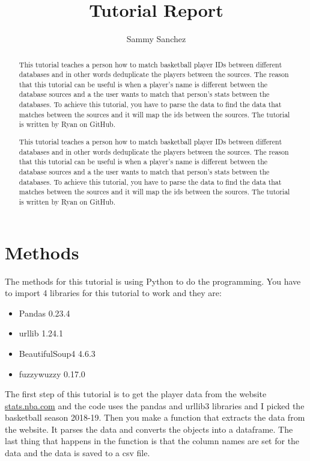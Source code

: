 \documentclass[10pt,twocolumn]{article}
\title{Tutorial Report}
\author{Sammy Sanchez}
\affiliation{Occidental College}
\begin{document}
\maketitle

\begin{abstract}

This tutorial teaches a person how to match basketball player IDs between different databases and in other words deduplicate the players between the sources. The reason that this tutorial can be useful is when a player's name is different between the database sources and a the user wants to match that person's stats between the databases. To achieve this tutorial, you have to parse the data to find the data that matches between the sources and it will map the ids between the sources. The tutorial is written by Ryan \textcite{Tutorial} on GitHub.

\end{abstract}

\begin{abstract}

This tutorial teaches a person how to match basketball player IDs between different databases and in other words deduplicate the players between the sources. The reason that this tutorial can be useful is when a player's name is different between the database sources and a the user wants to match that person's stats between the databases. To achieve this tutorial, you have to parse the data to find the data that matches between the sources and it will map the ids between the sources. The tutorial is written by Ryan \textcite{Tutorial} on GitHub.

\end{abstract}

\section{Methods}
The methods for this tutorial is using Python to do the programming. You have to import 4 libraries for this tutorial to work and they are:

\begin{itemize}
    \item Pandas 0.23.4
    \item urllib 1.24.1
    \item BeautifulSoup4 4.6.3
    \item fuzzywuzzy 0.17.0
\end{itemize}

The first step of this tutorial is to get the player data from the website \url{stats.nba.com} and the code uses the pandas and urllib3 libraries and I picked the basketball season 2018-19. Then you make a function that extracts the data from the website. It parses the data and converts the objects into a dataframe. The last thing that happens in the function is that the column names are set for the data and the data is saved to a csv file.
\end{document}
